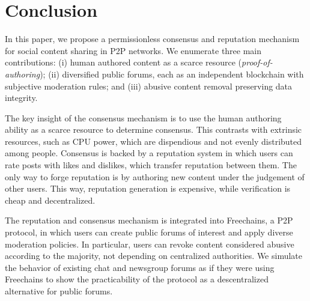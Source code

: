 \documentclass[12pt]{article}
\newcommand{\FC}       {Freechains\xspace}
\begin{document}
\section{Conclusion}
\label{sec.conclusion}

In this paper, we propose a permissionless consensus and reputation mechanism
for social content sharing in P2P networks.
We enumerate three main contributions:
    (i)   human authored content as a scarce resource
          (\emph{proof-of-authoring});
    (ii)  diversified public forums, each as an independent blockchain with
          subjective moderation rules; and
    (iii) abusive content removal preserving data integrity.

The key insight of the consensus mechanism is to use the human authoring
ability as a scarce resource to determine consensus.
This contrasts with extrinsic resources, such as CPU power, which are
dispendious and not evenly distributed among people.
%
Consensus is backed by a reputation system in which users can rate posts with
likes and dislikes, which transfer reputation between them.
The only way to forge reputation is by authoring new content under the
judgement of other users.
This way, reputation generation is expensive, while verification is cheap and
decentralized.

The reputation and consensus mechanism is integrated into \FC, a P2P protocol,
in which users can create public forums of interest and apply diverse
moderation policies.
In particular, users can revoke content considered abusive according to the
majority, not depending on centralized authorities.
%
We simulate the behavior of existing chat and newsgroup forums as if they were
using \FC to show the practicability of the protocol as a descentralized
alternative for public forums.
\end{document}
